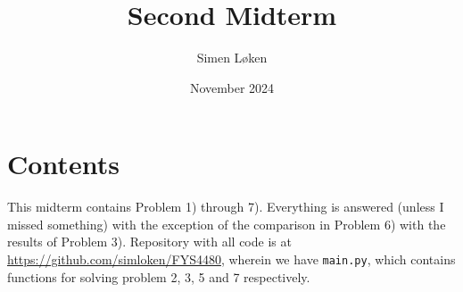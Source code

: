 \documentclass{article}
\title{Second Midterm}
\author{Simen Løken}
\date{November 2024}
\begin{document}
\maketitle
\renewcommand{\thesection}{Problem \arabic{section}}
\renewcommand{\thesubsection}{\alph{subsection})}
\section*{Contents}
This midterm contains Problem 1) through 7).\newline
Everything is answered (unless I missed something) with the exception of the comparison in Problem 6) with the results of Problem 3).
\newline
Repository with all code is at \href{https://github.com/simloken/FYS4480}{https://github.com/simloken/FYS4480}, wherein we have \texttt{main.py}, which contains functions for solving problem 2, 3, 5 and 7 respectively.
\end{document}
